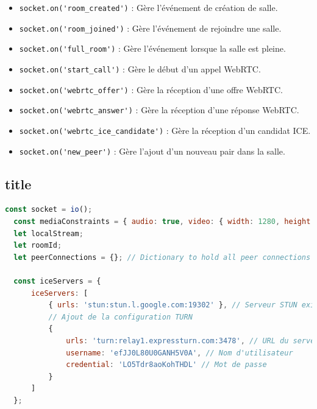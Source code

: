 \documentclass[12pt, a4paper, oneside]{Thesis}
\begin{document}
\begin{itemize}
  \item \verb|socket.on('room_created')| : Gère l'événement de création de salle.
  \item \verb|socket.on('room_joined')| : Gère l'événement de rejoindre une salle.
  \item \verb|socket.on('full_room')| : Gère l'événement lorsque la salle est pleine.
  \item \verb|socket.on('start_call')| : Gère le début d'un appel WebRTC.
  \item \verb|socket.on('webrtc_offer')| : Gère la réception d'une offre WebRTC.
  \item \verb|socket.on('webrtc_answer')| : Gère la réception d'une réponse WebRTC.
  \item \verb|socket.on('webrtc_ice_candidate')| : Gère la réception d'un candidat ICE.
  \item \verb|socket.on('new_peer')| : Gère l'ajout d'un nouveau pair dans la salle.
\end{itemize}

\newpage

\subsection{title}

\begin{lstlisting}[language=JavaScript, caption={Variables}, label=Variables]
  const socket = io();
  const mediaConstraints = { audio: true, video: { width: 1280, height: 720 } };
  let localStream;
  let roomId;
  let peerConnections = {}; // Dictionary to hold all peer connections
  
  const iceServers = {
      iceServers: [
          { urls: 'stun:stun.l.google.com:19302' }, // Serveur STUN existant
          // Ajout de la configuration TURN
          {
              urls: 'turn:relay1.expressturn.com:3478', // URL du serveur TURN
              username: 'efJJ0L80U0GANH5V0A', // Nom d'utilisateur
              credential: 'LO5Tdr8aoKohTHDL' // Mot de passe
          }
      ]
  };
\end{lstlisting}
\end{document}
